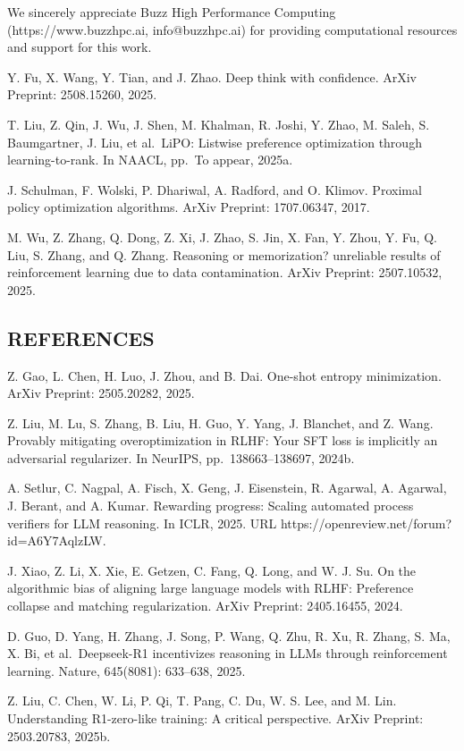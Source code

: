\documentclass[
  10
]{article}
\begin{document}
We sincerely appreciate Buzz High Performance Computing
(https://www.buzzhpc.ai, info@buzzhpc.ai) for providing computational
resources and support for this work.

Y. Fu, X. Wang, Y. Tian, and J. Zhao. Deep think with confidence. ArXiv
Preprint: 2508.15260, 2025.

T. Liu, Z. Qin, J. Wu, J. Shen, M. Khalman, R. Joshi, Y. Zhao, M. Saleh,
S. Baumgartner, J. Liu, et al.~LiPO: Listwise preference optimization
through learning-to-rank. In NAACL, pp.~To appear, 2025a.

J. Schulman, F. Wolski, P. Dhariwal, A. Radford, and O. Klimov. Proximal
policy optimization algorithms. ArXiv Preprint: 1707.06347, 2017.

M. Wu, Z. Zhang, Q. Dong, Z. Xi, J. Zhao, S. Jin, X. Fan, Y. Zhou, Y.
Fu, Q. Liu, S. Zhang, and Q. Zhang. Reasoning or memorization?
unreliable results of reinforcement learning due to data contamination.
ArXiv Preprint: 2507.10532, 2025.

\subsection{REFERENCES}\label{references}

Z. Gao, L. Chen, H. Luo, J. Zhou, and B. Dai. One-shot entropy
minimization. ArXiv Preprint: 2505.20282, 2025.

Z. Liu, M. Lu, S. Zhang, B. Liu, H. Guo, Y. Yang, J. Blanchet, and Z.
Wang. Provably mitigating overoptimization in RLHF: Your SFT loss is
implicitly an adversarial regularizer. In NeurIPS, pp.~138663--138697,
2024b.

A. Setlur, C. Nagpal, A. Fisch, X. Geng, J. Eisenstein, R. Agarwal, A.
Agarwal, J. Berant, and A. Kumar. Rewarding progress: Scaling automated
process verifiers for LLM reasoning. In ICLR, 2025. URL
https://openreview.net/forum?id=A6Y7AqlzLW.

J. Xiao, Z. Li, X. Xie, E. Getzen, C. Fang, Q. Long, and W. J. Su. On
the algorithmic bias of aligning large language models with RLHF:
Preference collapse and matching regularization. ArXiv Preprint:
2405.16455, 2024.

D. Guo, D. Yang, H. Zhang, J. Song, P. Wang, Q. Zhu, R. Xu, R. Zhang, S.
Ma, X. Bi, et al.~Deepseek-R1 incentivizes reasoning in LLMs through
reinforcement learning. Nature, 645(8081): 633--638, 2025.

Z. Liu, C. Chen, W. Li, P. Qi, T. Pang, C. Du, W. S. Lee, and M. Lin.
Understanding R1-zero-like training: A critical perspective. ArXiv
Preprint: 2503.20783, 2025b.
\end{document}

